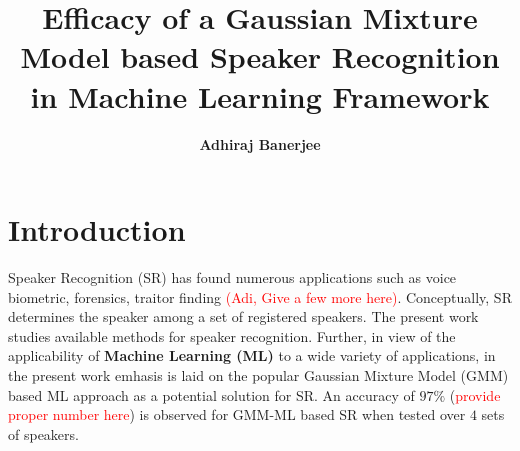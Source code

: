 \documentclass{article}
\title{\textbf{Efficacy of a Gaussian Mixture Model based Speaker Recognition in Machine Learning Framework}}
\author{\textbf{Adhiraj Banerjee}}
\begin{document}
\maketitle

\section{\textbf{{Introduction}}}
Speaker Recognition (SR) has found numerous applications such as voice biometric, forensics, traitor finding \textcolor{red}{(Adi, Give a few more here)}. Conceptually, SR determines the speaker among a set of registered speakers. The present work studies available methods for speaker recognition. Further, in view of the applicability of \textbf{Machine Learning (ML)} to a wide variety of applications, in the present work emhasis is laid on the popular Gaussian Mixture Model (GMM) based ML approach as a potential solution for SR. An accuracy of $97\%$ (\textcolor{red}{provide proper number here}) is observed for GMM-ML based SR when tested over $4$ sets of speakers.
\end{document}
